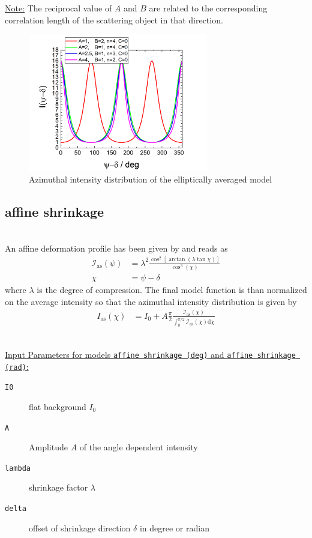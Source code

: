 \noindent \underline{Note:}
The reciprocal value of $A$ and $B$ are related to the corresponding correlation length of the scattering object in that direction.


\begin{figure}[htb]
\begin{center}
\includegraphics[width=0.7\textwidth]{../images/form_factor/azimuthal/ellipsoidal.png}
\end{center}
\caption{Azimuthal intensity distribution of the elliptically averaged model}
\label{fig:elliptically_averaged}
\end{figure}

\newpage

\subsection{affine shrinkage} ~\\
An affine deformation  profile has been given by \cite{Vilcinskas2015,Zlopasa2015} and reads as
\begin{align}
\mathcal{I}_\mathrm{as}(\psi) &= \lambda^2\frac{\cos^2\left[\arctan\left(\lambda \tan \chi\right)\right]}{\cos^3(\chi)} \\
\chi &= \psi-\delta
\end{align}
where $\lambda$ is the degree of compression. The final model function is than normalized on the average intensity so that the azimuthal intensity distribution is given by
\begin{align}
  I_\mathrm{as}(\chi) &= I_0 + A \frac{\pi}{2}\frac{\mathcal{I}_\mathrm{as}(\chi)}{\int_0^{\pi/2}\mathcal{I}_\mathrm{as}(\chi)\mathrm{d}\chi}
\end{align}

\hspace{1pt}\\
\underline{Input Parameters for models \texttt{affine shrinkage (deg)} and \texttt{affine shrinkage (rad)}:}\\
\begin{description}
\item[\texttt{I0}] flat background $I_0$
\item[\texttt{A}] Amplitude $A$ of the angle dependent intensity
\item[\texttt{lambda}] shrinkage factor $\lambda$
\item[\texttt{delta}] offset of shrinkage direction $\delta$ in degree or radian
\end{description}

